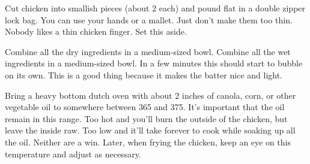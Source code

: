 \begin{IngredientsAndSteps}
    {}

    {}

    \ListIngredientsAndSteps[Then...]
    {
    }
    {
        Cut chicken into smallish pieces (about 2 \Ounce[s] each) and pound flat in a double zipper lock bag. You can
        use your hands or a mallet. Just don't make them too thin. Nobody likes a thin chicken finger. Set this aside.

        Combine all the dry ingredients in a medium-sized bowl. Combine all the wet ingredients in a medium-sized bowl. In a few
        minutes this should start to bubble on its own. This
        is a good thing because it makes the batter nice and light.

        Bring a heavy bottom dutch oven with about 2 inches of canola, corn, or other vegetable oil to somewhere between
        365 and 375\Degrees[F]. It's important that the oil remain in this range. Too hot and you'll burn the outside of the
        chicken, but leave the inside raw. Too low and it'll take forever to cook while soaking up all the oil. Neither
        are a win. Later, when frying the chicken, keep an eye on this temperature and adjust as necessary.

}
\end{IngredientsAndSteps}
